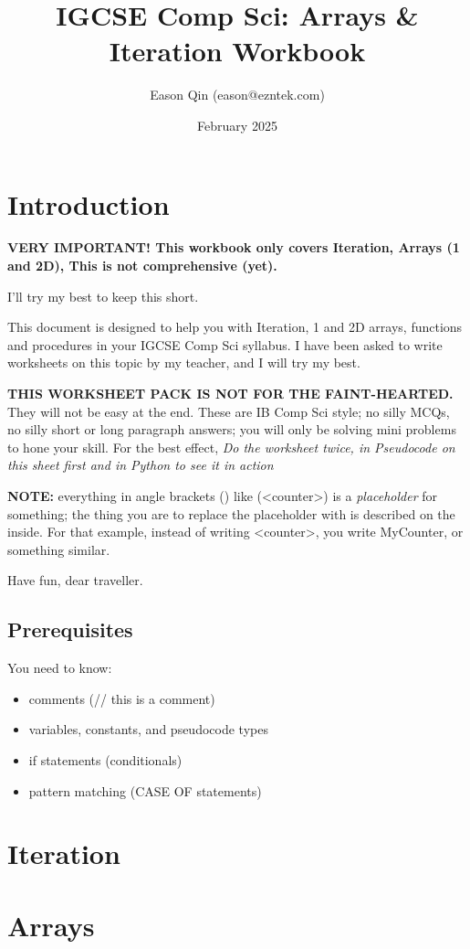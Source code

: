 \documentclass[a4paper, 11pt]{article}
\title{IGCSE Comp Sci: Arrays \& Iteration Workbook}
\author{Eason Qin (eason@ezntek.com)}
\date{February 2025}
\begin{document}
\setlength{\arrayrulewidth}{0.3pt}

\maketitle

\section{Introduction}

{\Large \textbf{VERY IMPORTANT! This workbook only covers Iteration, Arrays (1 and 2D), This is not comprehensive (yet).}}

I'll try my best to keep this short.

This document is designed to help you with Iteration, 1 and 2D arrays, functions and procedures in your IGCSE Comp Sci syllabus. I have been asked to write worksheets on this topic by my teacher, and I will try my best.

\textbf{THIS WORKSHEET PACK IS NOT FOR THE FAINT-HEARTED.} They will not be easy at the end. These are IB Comp Sci style; no silly MCQs, no silly short or long paragraph answers; you will only be solving mini problems to hone your skill. For the best effect, \emph{Do the worksheet twice, in Pseudocode on this sheet first and in Python to see it in action}

\textbf{NOTE:} everything in angle brackets ({\ccmono < >}) like ({\ccmono <counter>}) is a \emph{placeholder} for something; the thing you are to replace the placeholder with is described on the inside. For that example, instead of writing {\ccmono <counter>}, you write {\ccmono MyCounter}, or something similar.

Have fun, dear traveller.

\subsection{Prerequisites}

You need to know:

\begin{itemize}
    \item comments ({\ccmono // this is a comment})
    \item variables, constants, and pseudocode types
    \item if statements (conditionals)
    \item pattern matching ({\ccmono CASE OF} statements)
\end{itemize}

\newpage 
\section{Iteration}


\newpage
\section{Arrays}

\end{document}
